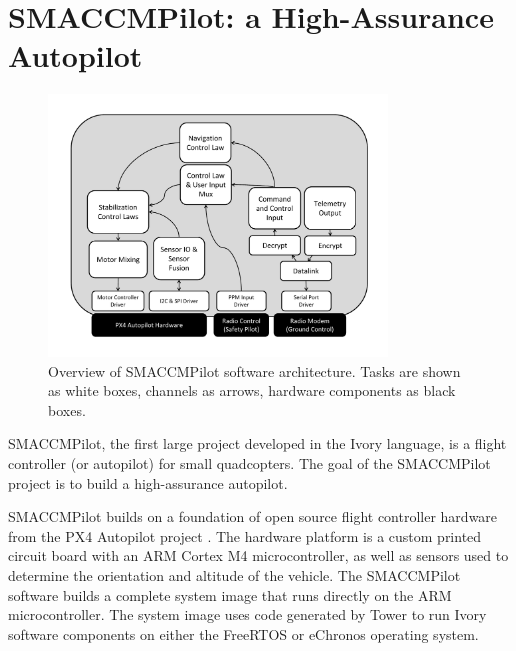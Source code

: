 \section{SMACCMPilot: a High-Assurance Autopilot}

\begin{figure}
\includegraphics[width=9cm]{figures/smaccmpilot-diagram-jan14}
\caption[SMACCMPilot software architecture]{Overview of SMACCMPilot
software architecture. Tasks are shown as white boxes, channels as arrows,
hardware components as black boxes.}
\end{figure}

SMACCMPilot, the first large project developed in the Ivory language, is a
flight controller (or autopilot) for small quadcopters. The goal of the
SMACCMPilot project is to build a high-assurance autopilot.

SMACCMPilot builds on a foundation of open source flight controller hardware
from the PX4 Autopilot project . The hardware platform is a
custom printed circuit board with an ARM Cortex M4 microcontroller, as well as
sensors used to determine the orientation and altitude of the vehicle.
 The
SMACCMPilot software builds a complete system image that runs directly on the
ARM microcontroller. The system image uses code generated by Tower to run Ivory
software components on either the FreeRTOS or eChronos operating system.

